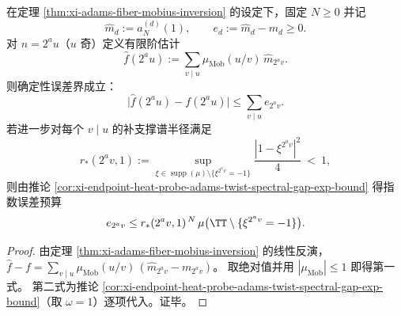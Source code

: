 \begin{corollary}\label{cor:xi-adams-fiber-mobius-inversion-finiteN-error}
在定理 \ref{thm:xi-adams-fiber-mobius-inversion} 的设定下，固定 \(N\ge 0\) 并记
\[
\widehat m_d:=a_N^{(d)}(1),\qquad e_d:=\widehat m_d-m_d\ge 0.
\]
对 \(n=2^{a}u\)（\(u\) 奇）定义有限阶估计
\[
\widehat f(2^{a}u):=\sum_{v\mid u}\mu_{\mathrm{Mob}}(u/v)\,\widehat m_{2^{a}v}.
\]
则确定性误差界成立：
\[
\bigl|\widehat f(2^{a}u)-f(2^{a}u)\bigr|
\le
\sum_{v\mid u} e_{2^{a}v}.
\]
若进一步对每个 \(v\mid u\) 的补支撑谱半径满足
\[
r_\ast(2^{a}v,1)
:=\sup_{\xi\in\operatorname{supp}(\mu)\setminus\{\xi^{2^{a}v}=-1\}}\frac{|1-\xi^{2^{a}v}|^2}{4}\ <\ 1,
\]
则由推论 \ref{cor:xi-endpoint-heat-probe-adams-twist-spectral-gap-exp-bound} 得指数误差预算
\[
e_{2^{a}v}\le r_\ast(2^{a}v,1)^{\,N}\,\mu\bigl(\TT\setminus\{\xi^{2^{a}v}=-1\}\bigr).
\]
\end{corollary}
\begin{proof}
由定理 \ref{thm:xi-adams-fiber-mobius-inversion} 的线性反演，
\(
\widehat f-f=\sum_{v\mid u}\mu_{\mathrm{Mob}}(u/v)\,(\widehat m_{2^{a}v}-m_{2^{a}v})
\)。
取绝对值并用 \(|\mu_{\mathrm{Mob}}|\le 1\) 即得第一式。
第二式为推论 \ref{cor:xi-endpoint-heat-probe-adams-twist-spectral-gap-exp-bound}（取 \(\omega=1\)）逐项代入。证毕。
\end{proof}

\endinput


